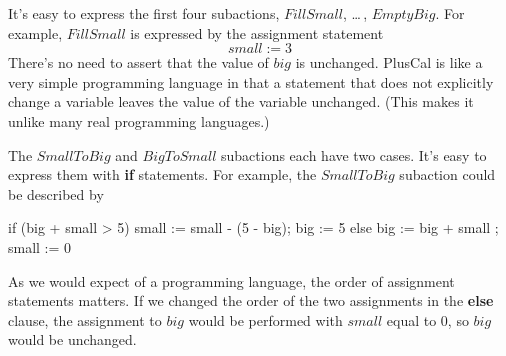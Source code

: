 \documentclass[fleqn,leqno]{article}
\begin{document}
It's easy to express the
first four subactions, $FillSmall$, \ldots\,, $EmptyBig$.  For example,
$FillSmall$ is expressed by the assignment statement
 \[ small := 3 \]
There's no need to assert that the value of $big$ is unchanged.
PlusCal is like a very simple programming language in that a statement
that does not explicitly change a variable leaves the value of the
variable unchanged.  (This makes it unlike many real programming
languages.)

The $SmallToBig$ and $BigToSmall$ subactions each have two cases.
It's easy to express them with \textbf{if} statements.  For example,
the $SmallToBig$ subaction could be described by
\begin{display}
\begin{nopcal}
if (big + small > 5) { small := small - (5 - big); 
                       big := 5                     }
else { big := big + small ;
       small := 0           }
\end{nopcal}
\begin{tlatex}
%
%
\end{tlatex}
\end{display}
As we would expect of a programming language, the order of assignment
statements matters.  If we changed the order of the two assignments in
the \textbf{else} clause, the assignment to $big$ would be performed
with $small$ equal to 0, so $big$ would be unchanged.
\end{document}
